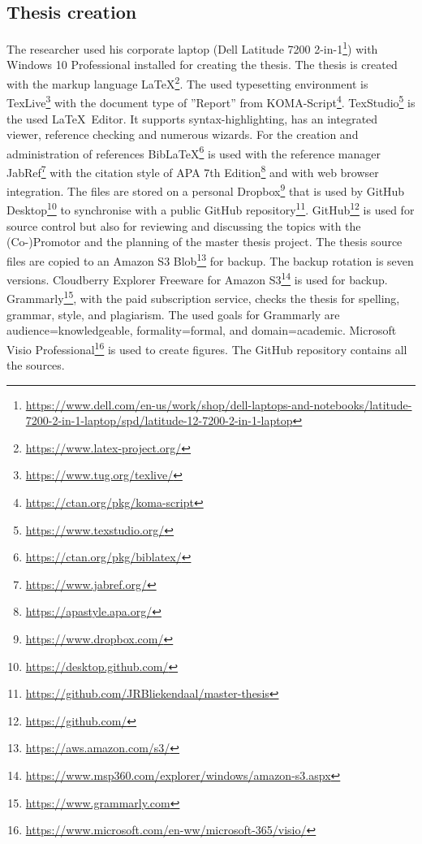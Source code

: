 \subsection{Thesis creation}
\label{sub:tbresearchcreation}
The researcher used his corporate laptop (Dell Latitude 7200 2-in-1\footnote{\url{https://www.dell.com/en-us/work/shop/dell-laptops-and-notebooks/latitude-7200-2-in-1-laptop/spd/latitude-12-7200-2-in-1-laptop}}) with Windows 10 Professional installed for creating the thesis. The thesis is created with the markup language \LaTeX\footnote{\url{https://www.latex-project.org/}}. The used typesetting environment is TexLive\footnote{\url{https://www.tug.org/texlive/}} with the document type of ''Report'' from KOMA-Script\footnote{\url{https://ctan.org/pkg/koma-script}}. TexStudio\footnote{\url{https://www.texstudio.org/}} is the used \LaTeX\ Editor. It supports syntax-highlighting, has an integrated viewer, reference checking and numerous wizards. For the creation and administration of references Bib\LaTeX\footnote{\url{https://ctan.org/pkg/biblatex/}} is used with the reference manager JabRef\footnote{\url{https://www.jabref.org/}} with the citation style of APA 7th Edition\footnote{\url{https://apastyle.apa.org/}} and with web browser integration. The files are stored on a personal Dropbox\footnote{\url{https://www.dropbox.com/}} that is used by GitHub Desktop\footnote{\url{https://desktop.github.com/}} to synchronise with a public GitHub repository\footnote{\url{https://github.com/JRBliekendaal/master-thesis}}. GitHub\footnote{\url{https://github.com/}} is used for source control but also for reviewing and discussing the topics with the (Co-)Promotor and the planning of the master thesis project. The thesis source files are copied to an Amazon S3 Blob\footnote{\url{https://aws.amazon.com/s3/}} for backup. The backup rotation is seven versions. Cloudberry Explorer Freeware for Amazon S3\footnote{\url{https://www.msp360.com/explorer/windows/amazon-s3.aspx}} is used for backup. Grammarly\footnote{\url{https://www.grammarly.com}}, with the paid subscription service, checks the thesis for spelling, grammar,  style, and plagiarism. The used goals for Grammarly are audience=knowledgeable, formality=formal, and domain=academic. Microsoft Visio Professional\footnote{\url{https://www.microsoft.com/en-ww/microsoft-365/visio/}} is used to create figures. The GitHub repository contains all the sources.
